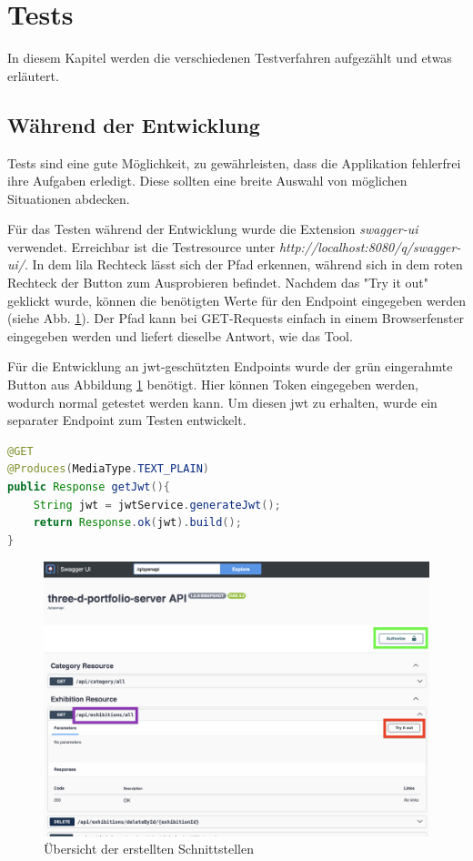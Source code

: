 \section{Tests}
In diesem Kapitel werden die verschiedenen Testverfahren aufgezählt und etwas erläutert.  

\subsection{Während der Entwicklung}
\label{chapter:implementation:tests}
Tests sind eine gute Möglichkeit, zu gewährleisten, dass die Applikation fehlerfrei ihre Aufgaben erledigt. 
Diese sollten eine breite Auswahl von möglichen Situationen abdecken.

Für das Testen während der Entwicklung wurde die Extension \emph{swagger-ui} verwendet. 
Erreichbar ist die Testresource unter \emph{http://localhost:8080/q/swagger-ui/}. 
In dem lila Rechteck lässt sich der Pfad erkennen, während sich in dem roten Rechteck der Button zum Ausprobieren befindet. 
Nachdem das "Try it out" geklickt wurde, können die benötigten Werte für den Endpoint eingegeben werden (siehe Abb. \ref{fig:implementation:swaggerui}). 
Der Pfad kann bei GET-Requests einfach in einem Browserfenster eingegeben werden und liefert dieselbe Antwort, wie das Tool. 

Für die Entwicklung an \gls{jwt}-geschützten Endpoints wurde der grün eingerahmte Button aus Abbildung \ref{fig:implementation:swaggerui} benötigt. 
Hier können Token eingegeben werden, wodurch normal getestet werden kann. 
Um diesen \gls{jwt} zu erhalten, wurde ein separater Endpoint zum Testen entwickelt. 

\begin{lstlisting}[label=lst:test:testjwt, language=Java]
@GET
@Produces(MediaType.TEXT_PLAIN)
public Response getJwt(){
    String jwt = jwtService.generateJwt();
    return Response.ok(jwt).build();
}
\end{lstlisting}

\begin{figure}
    \centering
    \includegraphics[scale=0.3]{pics/swaggerui.png}
    \caption{Übersicht der erstellten Schnittstellen}
    \label{fig:implementation:swaggerui}
\end{figure}

